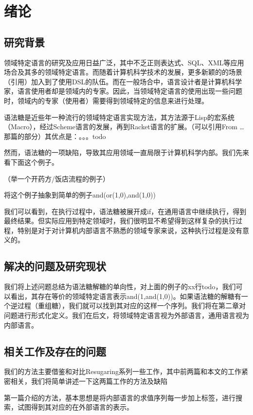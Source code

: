 \pagestyle{fancy}
\normalsize
\linespread{1.5}\selectfont
\chapter{绪论}

\section{研究背景}
领域特定语言的研究及应用日益广泛，其中不乏正则表达式、SQL、XML等应用场合及其多的领域特定语言。而随着计算机科学技术的发展，更多新颖的的场景（引用）加入到了使用DSL的队伍。而在一般场合中，语言设计者是计算机科学家，语言使用者却是领域内的专家。因此，当领域特定语言的使用出现一些问题时，领域内的专家（使用者）需要得到领域特定的信息来进行处理。

语法糖是近些年一种流行的领域特定语言实现方法，其方法源于Lisp的宏系统（Macro），经过Scheme语言的发展，再到Racket语言的扩展。（可以引用From …那篇的部分）其优点是：。。。todo

然而，语法糖的一项缺陷，导致其应用领域一直局限于计算机科学内部。我们先来看下面这个例子。

（举一个开药方/饭店流程的例子）

将这个例子抽象到简单的例子and(or(1,0),and(1,0))

我们可以看到，在执行过程中，语法糖被展开成if，在通用语言中继续执行，得到最终结果。但实际应用到特定领域时，我们很明显不希望得到这样复杂的执行过程，特别是对于对计算机内部语言不熟悉的领域专家来说，这种执行过程是没有意义的。

\section{解决的问题及研究现状}
我们将上述问题总结为语法糖解糖的单向性，对上面的例子的xx行todo，我们可以看出，其存在等价的领域特定语言表示and(1,and(1,0))。如果语法糖的解糖有一个逆过程（重组糖），我们就可以找到其对应的这样一个序列。我们将在第二章对问题进行形式化定义。我们在后文，将领域特定语言视为外部语言，通用语言视为内部语言。

\section{相关工作及存在的问题}
我们的方法主要借鉴和对比Resugaring系列一些工作，其中前两篇和本文的工作紧密相关，我们将简单讲述一下这两篇工作的方法及缺陷

第一篇介绍的方法，基本思想是将内部语言的求值序列每一步加上标签，进行搜索，试图得到其对应的在外部语言的表示。

